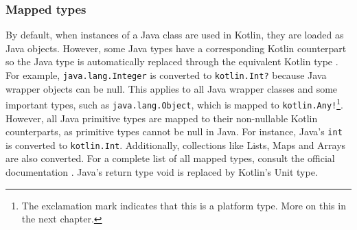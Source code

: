 \documentclass[a4paper,11pt]{article}
\begin{document}
\subsubsection{Mapped types}
By default, when instances of a Java class are used in Kotlin, they are loaded as Java objects. However, some Java types have a corresponding Kotlin counterpart so the Java type is automatically replaced through the equivalent Kotlin type \cite{interop-mapped-types}. For example, \texttt{java.lang.Integer} is converted to \texttt{kotlin.Int?} because Java wrapper objects can be null. This applies to all Java wrapper classes and some important types, such as \texttt{java.lang.Object}, which is mapped to \texttt{kotlin.Any!}\footnote{The exclamation mark indicates that this is a platform type. More on this in the next chapter.}. However, all Java primitive types are mapped to their non-nullable Kotlin counterparts, as primitive types cannot be null in Java. For instance, Java's \texttt{int} is converted to \texttt{kotlin.Int}. Additionally, collections like Lists, Maps and Arrays are also converted. For a complete list of all mapped types, consult the official documentation \cite{interop-mapped-types}. Java's return type void is replaced by Kotlin's Unit type.
\end{document}
